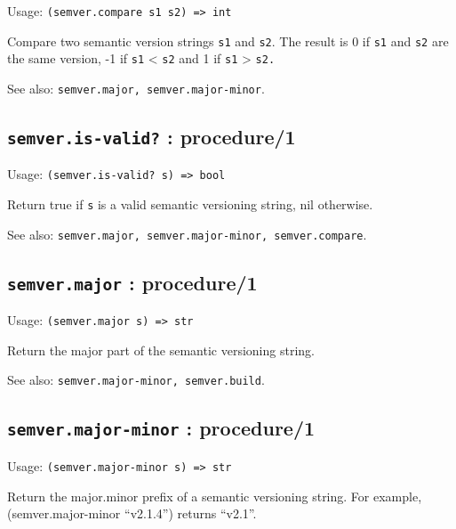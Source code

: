 \documentclass[
]{article}
\newcommand{\passthrough}[1]{#1}
\begin{document}
Usage: \passthrough{\lstinline!(semver.compare s1 s2) => int!}

Compare two semantic version strings \passthrough{\lstinline!s1!} and
\passthrough{\lstinline!s2!}. The result is 0 if
\passthrough{\lstinline!s1!} and \passthrough{\lstinline!s2!} are the
same version, -1 if \passthrough{\lstinline!s1!} \textless{}
\passthrough{\lstinline!s2!} and 1 if \passthrough{\lstinline!s1!}
\textgreater{} \passthrough{\lstinline!s2.!}

See also: \passthrough{\lstinline!semver.major, semver.major-minor!}.

\hypertarget{semver.is-valid-procedure1-1}{%
\subsection{\texorpdfstring{\texttt{semver.is-valid?} :
procedure/1}{semver.is-valid? : procedure/1}}\label{semver.is-valid-procedure1-1}}

Usage: \passthrough{\lstinline!(semver.is-valid? s) => bool!}

Return true if \passthrough{\lstinline!s!} is a valid semantic
versioning string, nil otherwise.

See also:
\passthrough{\lstinline!semver.major, semver.major-minor, semver.compare!}.

\hypertarget{semver.major-procedure1-1}{%
\subsection{\texorpdfstring{\texttt{semver.major} :
procedure/1}{semver.major : procedure/1}}\label{semver.major-procedure1-1}}

Usage: \passthrough{\lstinline!(semver.major s) => str!}

Return the major part of the semantic versioning string.

See also: \passthrough{\lstinline!semver.major-minor, semver.build!}.

\hypertarget{semver.major-minor-procedure1-1}{%
\subsection{\texorpdfstring{\texttt{semver.major-minor} :
procedure/1}{semver.major-minor : procedure/1}}\label{semver.major-minor-procedure1-1}}

Usage: \passthrough{\lstinline!(semver.major-minor s) => str!}

Return the major.minor prefix of a semantic versioning string. For
example, (semver.major-minor ``v2.1.4'') returns ``v2.1''.
\end{document}
